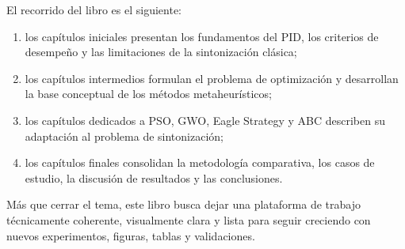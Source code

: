 El recorrido del libro es el siguiente:
\begin{enumerate}[label=\arabic*.]
    \item los capítulos iniciales presentan los fundamentos del PID, los criterios de desempeño y las limitaciones de la sintonización clásica;
    \item los capítulos intermedios formulan el problema de optimización y desarrollan la base conceptual de los métodos metaheurísticos;
    \item los capítulos dedicados a PSO, GWO, Eagle Strategy y ABC describen su adaptación al problema de sintonización;
    \item los capítulos finales consolidan la metodología comparativa, los casos de estudio, la discusión de resultados y las conclusiones.
\end{enumerate}

Más que cerrar el tema, este libro busca dejar una plataforma de trabajo técnicamente
coherente, visualmente clara y lista para seguir creciendo con nuevos experimentos,
figuras, tablas y validaciones.
